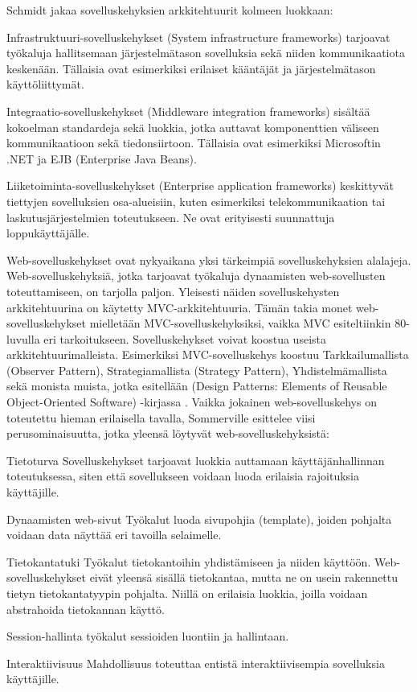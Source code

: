 \documentclass[utf8]{gradu3}
\begin{document}
Schmidt \parencite{frameworks} jakaa sovelluskehyksien arkkitehtuurit kolmeen luokkaan:


\begin{desclist}
\item[Infrastruktuuri-sovelluskehykset (System infrastructure frameworks)] tarjoavat työkaluja hallitsemaan järjestelmätason sovelluksia sekä niiden kommunikaatiota keskenään. Tällaisia ovat esimerkiksi erilaiset kääntäjät ja järjestelmätason käyttöliittymät. 
\item[Integraatio-sovelluskehykset (Middleware integration frameworks)] sisältää kokoelman standardeja sekä luokkia, jotka auttavat komponenttien väliseen kommunikaatioon sekä tiedonsiirtoon. Tällaisia ovat esimerkiksi Microsoftin .NET ja EJB (Enterprise Java Beans). 
\item[Liiketoiminta-sovelluskehykset (Enterprise application frameworks)] keskittyvät tiettyjen sovelluksien osa-alueisiin, kuten esimerkiksi telekommunikaation tai laskutusjärjestelmien toteutukseen. Ne ovat erityisesti suunnattuja loppukäyttäjälle.
\end{desclist}

Web-sovelluskehykset ovat nykyaikana yksi tärkeimpiä sovelluskehyksien alalajeja. Web-sovelluskehyksiä, jotka tarjoavat työkaluja dynaamisten web-sovellusten toteuttamiseen, on tarjolla paljon. Yleisesti näiden sovelluskehysten arkkitehtuurina on käytetty MVC-arkkitehtuuria. Tämän takia monet web-sovelluskehykset mielletään MVC-sovelluskehyksiksi, vaikka MVC esiteltiinkin 80-luvulla eri tarkoitukseen. Sovelluskehykset voivat koostua useista arkkitehtuurimalleista. Esimerkiksi MVC-sovelluskehys koostuu Tarkkailumallista (Observer Pattern), Strategiamallista (Strategy Pattern), Yhdistelmämallista sekä monista muista, jotka esitellään (Design Patterns: Elements of Reusable Object-Oriented Software) -kirjassa \parencite{design_patterns}. Vaikka jokainen web-sovelluskehys on toteutettu hieman erilaisella tavalla, Sommerville esittelee viisi perusominaisuutta, jotka yleensä löytyvät web-sovelluskehyksistä:

\begin{desclist}
\item[Tietoturva] Sovelluskehykset tarjoavat luokkia auttamaan käyttäjänhallinnan toteutuksessa, siten että sovellukseen voidaan luoda erilaisia rajoituksia käyttäjille. 
\item[Dynaamisten web-sivut] Työkalut luoda sivupohjia (template), joiden pohjalta voidaan data näyttää eri tavoilla selaimelle.
\item[Tietokantatuki] Työkalut tietokantoihin yhdistämiseen ja niiden käyttöön. Web-sovelluskehykset eivät yleensä sisällä tietokantaa, mutta ne on usein rakennettu tietyn tietokantatyypin pohjalta. Niillä on erilaisia luokkia, joilla voidaan abstrahoida tietokannan käyttö.
\item[Session-hallinta] työkalut sessioiden luontiin ja hallintaan.
\item[Interaktiivisuus] Mahdollisuus toteuttaa entistä interaktiivisempia sovelluksia käyttäjille. 
\end{desclist}
\end{document}

